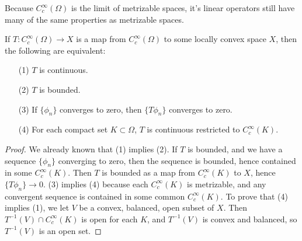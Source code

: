 Because $C_c^\infty(\Omega)$ is the limit of metrizable spaces, it's linear operators still have many of the same properties as metrizable spaces.

\begin{theorem}
    If $T: C_c^\infty(\Omega) \to X$ is a map from $C_c^\infty(\Omega)$ to some locally convex space $X$, then the following are equivalent:
    \begin{itemize}
        \item[(1)] $T$ is continuous.
        \item[(2)] $T$ is bounded.
        \item[(3)] If $\{ \phi_n \}$ converges to zero, then $\{ T\phi_n \}$ converges to zero.
        \item[(4)] For each compact set $K \subset \Omega$, $T$ is continuous restricted to $C_c^\infty(K)$.
    \end{itemize}
\end{theorem}
\begin{proof}
    We already known that (1) implies (2). If $T$ is bounded, and we have a sequence $\{ \phi_n \}$ converging to zero, then the sequence is bounded, hence contained in some $C_c^\infty(K)$. Then $T$ is bounded as a map from $C_c^\infty(K)$ to $X$, hence $\{ T\phi_n \} \to 0$. (3) implies (4) because each $C_c^\infty(K)$ is metrizable, and any convergent sequence is contained in some common $C_c^\infty(K)$. To prove that (4) implies (1), we let $V$ be a convex, balanced, open subset of $X$. Then $T^{-1}(V) \cap C_c^\infty(K)$ is open for each $K$, and $T^{-1}(V)$ is convex and balanced, so $T^{-1}(V)$ is an open set.
\end{proof}

